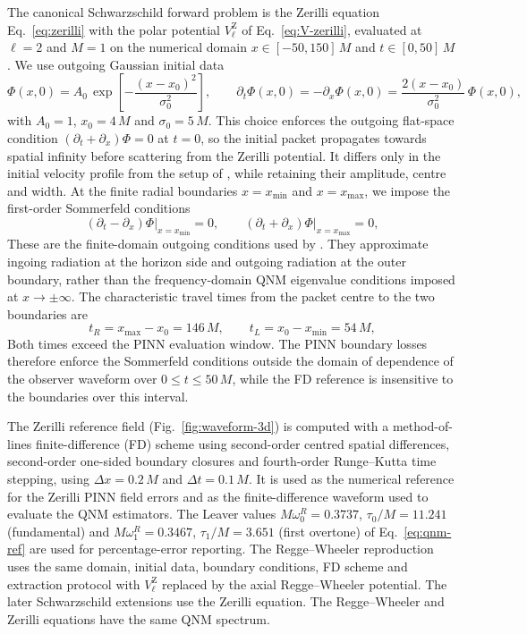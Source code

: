 The canonical Schwarzschild forward problem is the Zerilli equation
Eq.~\eqref{eq:zerilli} with the polar potential
$V_{\ell}^{\mathrm{Z}}$ of Eq.~\eqref{eq:V-zerilli}, evaluated at
$\ell=2$ and $M=1$ on the numerical domain
$x\in[-50,150]\,M$ and $t\in[0,50]\,M$. We use
outgoing Gaussian initial data
\begin{equation}
  \Phi(x,0) = A_0\,\exp\!\left[-\frac{(x-x_0)^2}{\sigma_0^2}\right],
  \qquad
  \partial_t \Phi(x,0) = -\partial_x \Phi(x,0)
  = \frac{2(x-x_0)}{\sigma_0^2}\,\Phi(x,0),
  \label{eq:ic}
\end{equation}
with $A_0 = 1$, $x_0 = 4\,M$ and $\sigma_0 = 5\,M$. This choice
enforces the outgoing flat-space condition
$(\partial_t+\partial_x)\Phi=0$ at $t=0$, so the initial packet
propagates towards spatial infinity before scattering from the
Zerilli potential. It differs only in the initial velocity profile
from the setup of \citet{Patel2024pinn}, while retaining their
amplitude, centre and width. At the finite radial boundaries
$x=x_{\min}$ and $x=x_{\max}$, we impose the first-order Sommerfeld
conditions
\begin{equation}
  (\partial_t - \partial_x)\Phi\bigl|_{x=x_{\min}} = 0, \qquad
  (\partial_t + \partial_x)\Phi\bigl|_{x=x_{\max}} = 0,
  \label{eq:bc-sommerfeld}
\end{equation}
These are the finite-domain outgoing conditions used by
\citet{Patel2024pinn}. They approximate ingoing radiation at the
horizon side and outgoing radiation at the outer boundary, rather
than the frequency-domain QNM eigenvalue conditions imposed at
$x\to\pm\infty$. The characteristic travel times from the packet
centre to the two boundaries are
\begin{equation}
  t_{R} = x_{\max} - x_0 = 146\,M, \qquad
  t_{L} = x_0 - x_{\min} = 54\,M,
  \label{eq:bc-arrival}
\end{equation}
Both times exceed the PINN evaluation window. The PINN boundary losses
therefore enforce the Sommerfeld conditions outside the domain of
dependence of the observer waveform over $0\leq t\leq50\,M$, while the
FD reference is insensitive to the boundaries over this interval.

The Zerilli reference field (Fig.~\ref{fig:waveform-3d}) is computed
with a method-of-lines finite-difference (FD) scheme using second-order centred
spatial differences, second-order one-sided boundary closures and
fourth-order Runge--Kutta time stepping, using $\Delta x = 0.2\,M$
and $\Delta t = 0.1\,M$. It is used as the numerical reference for
the Zerilli PINN field errors and as the finite-difference waveform
used to evaluate the QNM estimators. The Leaver values
$M\omega_0^R = 0.3737$,
$\tau_0/M = 11.241$ (fundamental) and $M\omega_1^R = 0.3467$,
$\tau_1/M = 3.651$ (first overtone) of Eq.~\eqref{eq:qnm-ref}
are used for percentage-error reporting.
The Regge--Wheeler reproduction uses the same domain, initial data,
boundary conditions, FD scheme and extraction protocol with
$V_{\ell}^{\mathrm{Z}}$ replaced by the axial Regge--Wheeler
potential. The later Schwarzschild extensions use the Zerilli
equation. The Regge--Wheeler and Zerilli equations have the same QNM
spectrum.

